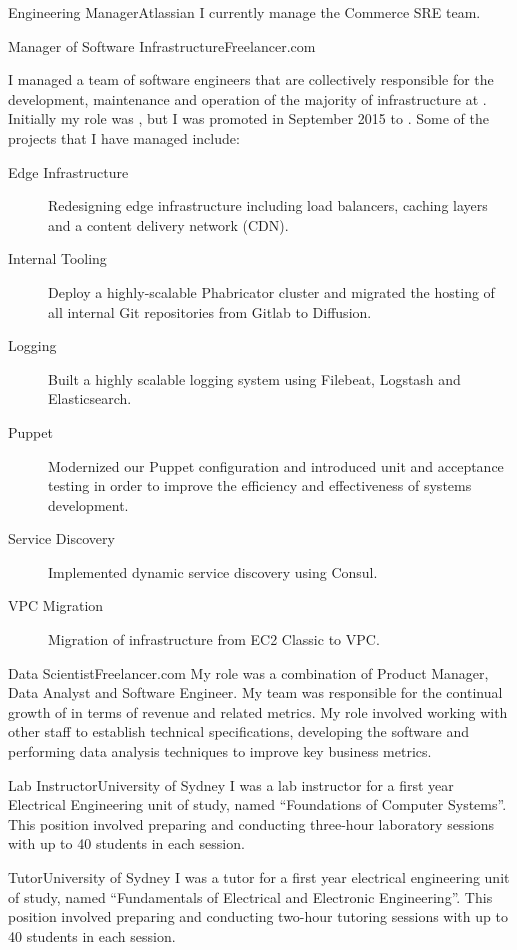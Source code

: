 \begin{professionalExperience}

{Engineering Manager}{Atlassian}
{I currently manage the Commerce SRE team.}

{Manager of Software Infrastructure}{Freelancer.com}
{
  I managed a team of software engineers that are collectively
  responsible for the development, maintenance and operation of the majority of
  infrastructure at . Initially my role was
  , but I was promoted in September
  2015 to . Some of the projects
  that I have managed include:

  \begin{description}
    \item[Edge Infrastructure] Redesigning edge infrastructure including load
      balancers, caching layers and a content delivery network (CDN).
    \item[Internal Tooling] Deploy a highly-scalable Phabricator cluster and
      migrated the hosting of all internal Git repositories from Gitlab to
      Diffusion.
    \item[Logging] Built a highly scalable logging system using Filebeat,
      Logstash and Elasticsearch.
    \item[Puppet] Modernized our Puppet configuration and introduced unit and
      acceptance testing in order to improve the efficiency and effectiveness of
      systems development.
    \item[Service Discovery] Implemented dynamic service discovery using Consul.
    \item[VPC Migration] Migration of infrastructure from EC2 Classic to VPC\@.
  \end{description}
}

{Data Scientist}{Freelancer.com}
{My role was a combination of Product Manager, Data Analyst and Software
Engineer. My team was responsible for the continual growth of
 in terms of revenue and related metrics. My role
involved working with other staff to establish technical specifications,
developing the software and performing data analysis techniques to improve key
business metrics.}

{Lab Instructor}{University of Sydney}
{I was a lab instructor for a first year Electrical Engineering unit of study,
named ``Foundations of Computer Systems''. This position involved preparing
and conducting three-hour laboratory sessions with up to 40 students in each
session.}

{Tutor}{University of Sydney}
{I was a tutor for a first year electrical engineering unit of study, named
``Fundamentals of Electrical and Electronic Engineering''. This position
involved preparing and conducting two-hour tutoring sessions with up to 40
students in each session.}

\end{professionalExperience}
